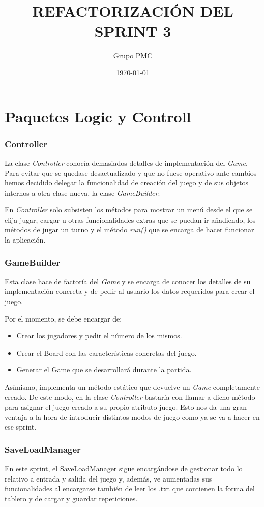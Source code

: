 \documentclass{article}
\title{REFACTORIZACIÓN DEL SPRINT 3}
\date{\today}
\author{Grupo PMC}
\begin{document}
\maketitle

\section*{Paquetes Logic y Controll}
\subsubsection*{Controller}
La clase \textit{Controller} conocía demasiados detalles de implementación del \textit{Game}. Para evitar que se quedase desactualizado y que no fuese operativo ante cambios hemos decidido delegar la funcionalidad de creación del juego y de sus objetos internos a otra clase nueva, la clase \textit{GameBuilder}.

En \textit{Controller} solo subsisten los métodos para mostrar un menú desde el que se elija jugar, cargar u otras funcionalidades extras que se puedan ir añadiendo, los métodos de jugar un turno y el método \textit{run()} que se encarga de hacer funcionar la aplicación.

\subsubsection*{GameBuilder}
Esta clase hace de factoría del \textit{Game} y se encarga de conocer los detalles de su implementación concreta y de pedir al usuario los datos requeridos para crear el juego.

Por el momento, se debe encargar de:
\begin{itemize}
\item Crear los jugadores y pedir el número de los mismos.
\item Crear el Board con las características concretas del juego.
\item Generar el Game que se desarrollará durante la partida.
\end{itemize}

Asímismo, implementa un método estático que devuelve un \textit{Game} completamente creado. De este modo, en la clase \textit{Controller} bastaría con llamar a dicho método para asignar el juego creado a su propio atributo juego. Esto nos da una gran ventaja a la hora de introducir distintos modos de juego como ya se va a hacer en ese sprint.

\subsubsection*{SaveLoadManager}
En este sprint, el SaveLoadManager sigue encargándose de gestionar todo lo relativo a entrada y salida del juego y, además, ve aumentadas sus funcionalidades al encargarse también de leer los .txt que contienen la forma del tablero y de cargar y guardar repeticiones.
\end{document}
